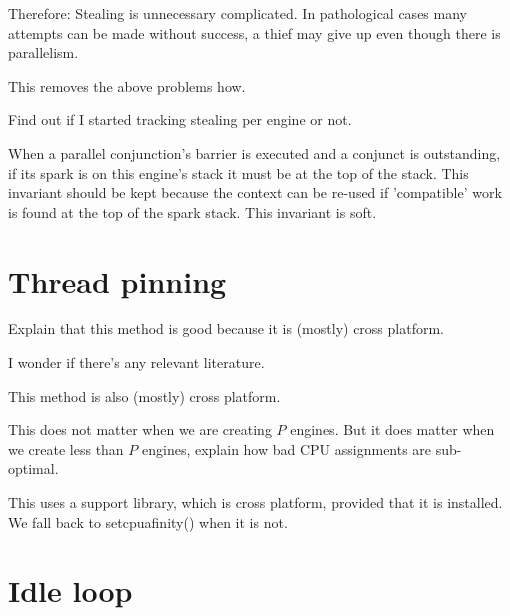 Therefore:
Stealing is unnecessary complicated.
In pathological cases many attempts can be made without success,
a thief may give up even though there is parallelism.

This removes the above problems how.

Find out if I started tracking stealing per engine or not.

When a parallel conjunction's barrier is executed and a conjunct is
outstanding, if its spark is on this engine's stack it must be at the top of
the stack.
This invariant should be kept because the context can be re-used if
'compatible' work is found at the top of the spark stack.
This invariant is soft.


\section{Thread pinning}
\label{sec:thread_pinning}


Explain that this method is good because it is (mostly) cross platform.

I wonder if there's any relevant literature.

This method is also (mostly) cross platform.

This does not matter when we are creating $P$ engines.
But it does matter when we create less than $P$ engines,
explain how bad CPU assignments are sub-optimal.

This uses a support library, which is cross platform, provided that it is installed.
We fall back to setcpuafinity() when it is not.


\section{Idle loop}
\label{sec:idle_loop}

